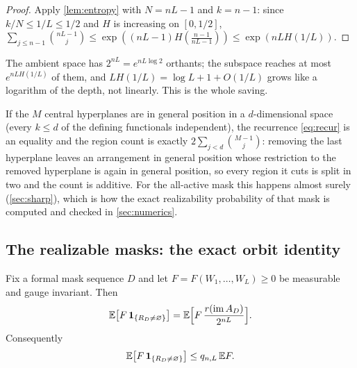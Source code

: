 \begin{proof}
Apply \cref{lem:entropy} with $N=nL-1$ and $k=n-1$: since $k/N\le 1/L\le 1/2$ and $H$ is increasing on $[0,1/2]$, $\sum_{j\le n-1}\binom{nL-1}{j}\le\exp((nL-1)H(\tfrac{n-1}{nL-1}))\le\exp(nLH(1/L))$.
\end{proof}

The ambient space has $2^{nL}=e^{nL\log 2}$ orthants; the subspace reaches at most $e^{nLH(1/L)}$ of them, and $LH(1/L)=\log L+1+O(1/L)$ grows like a logarithm of the depth, not linearly. This is the whole saving.

\begin{remark}
If the $M$ central hyperplanes are in general position in a $d$-dimensional space (every $k\le d$ of the defining functionals independent), the recurrence \cref{eq:recur} is an equality and the region count is exactly $2\sum_{j<d}\binom{M-1}{j}$: removing the last hyperplane leaves an arrangement in general position whose restriction to the removed hyperplane is again in general position, so every region it cuts is split in two and the count is additive. For the all-active mask this happens almost surely (\cref{sec:sharp}), which is how the exact realizability probability of that mask is computed and checked in \cref{sec:numerics}.
\end{remark}

\subsection{The realizable masks: the exact orbit identity}

\begin{proposition}\label{prop:orbit}
Fix a formal mask sequence $D$ and let $F=F(W_1,\dots,W_L)\ge 0$ be measurable and gauge invariant. Then
\begin{equation}\label{eq:orbit}
\mathbb{E}\bigl[F\,\mathbf{1}_{\{R_D\ne\varnothing\}}\bigr]=\mathbb{E}\Bigl[F\,\frac{r(\operatorname{im} A_D)}{2^{nL}}\Bigr].
\end{equation}
Consequently
\begin{equation}\label{eq:orbit-bound}
\mathbb{E}\bigl[F\,\mathbf{1}_{\{R_D\ne\varnothing\}}\bigr]\le q_{n,L}\,\mathbb{E} F .
\end{equation}
\end{proposition}

